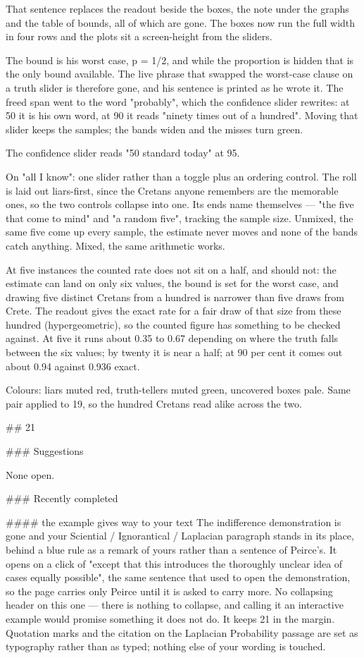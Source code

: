 That sentence replaces the readout beside the boxes, the note under the graphs
and the table of bounds, all of which are gone. The boxes now run the full width
in four rows and the plots sit a screen-height from the sliders.

The bound is his worst case, p = 1/2, and while the proportion is hidden that is
the only bound available. The live phrase that swapped the worst-case clause on
a truth slider is therefore gone, and his sentence is printed as he wrote it.
The freed span went to the word "probably", which the confidence slider
rewrites: at 50 it is his own word, at 90 it reads "ninety times out of a
hundred". Moving that slider keeps the samples; the bands widen and the misses
turn green.

The confidence slider reads "50%
standard today" at 95.

On "all I know": one slider rather than a toggle plus an ordering control. The
roll is laid out liars-first, since the Cretans anyone remembers are the
memorable ones, so the two controls collapse into one. Its ends name themselves
— "the five that come to mind" and "a random five", tracking the sample size.
Unmixed, the same five come up every sample, the estimate never moves and none
of the bands catch anything. Mixed, the same arithmetic works.

At five instances the counted rate does not sit on a half, and should not: the
estimate can land on only six values, the bound is set for the worst case, and
drawing five distinct Cretans from a hundred is narrower than five draws from
Crete. The readout gives the exact rate for a fair draw of that size from these
hundred (hypergeometric), so the counted figure has something to be checked
against. At five it runs about 0.35 to 0.67 depending on where the truth falls
between the six values; by twenty it is near a half; at 90 per cent it comes out
about 0.94 against 0.936 exact.

Colours: liars muted red, truth-tellers muted green, uncovered boxes pale. Same
pair applied to 19, so the hundred Cretans read alike across the two.


## 21

### Suggestions

None open.

### Recently completed

#### the example gives way to your text
The indifference demonstration is gone and your Sciential / Ignorantical /
Laplacian paragraph stands in its place, behind a blue rule as a remark of yours
rather than a sentence of Peirce's. It opens on a click of "except that this
introduces the thoroughly unclear idea of cases equally possible", the same
sentence that used to open the demonstration, so the page carries only Peirce
until it is asked to carry more. No collapsing header on this one — there is
nothing to collapse, and calling it an interactive example would promise
something it does not do. It keeps 21 in the margin. Quotation marks and the
citation on the Laplacian Probability passage are set as typography rather than
as typed; nothing else of your wording is touched.

